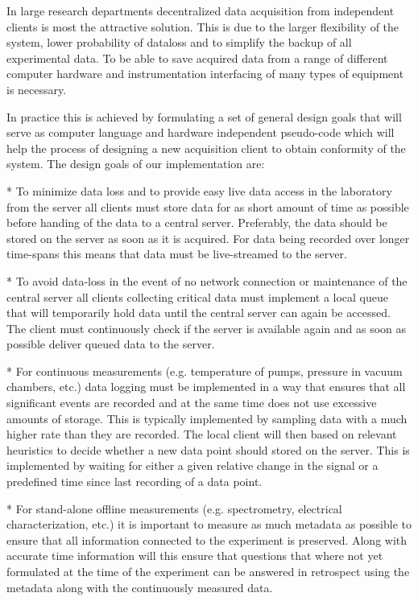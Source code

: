 In large research departments decentralized data acquisition from independent
clients is most the attractive solution. This is due to the larger flexibility
of the system, lower probability of dataloss and to simplify the backup of all
experimental data. To be able to save acquired data from a range of different
computer hardware and instrumentation interfacing of many types of equipment is
necessary.

In practice this is achieved by formulating a set of general design goals that
will serve as computer language and hardware independent pseudo-code which will
help the process of designing a new acquisition client to obtain conformity of
the system. The design goals of our implementation are:

* To minimize data loss and to provide easy live data access in the laboratory
  from the server all clients must store data for as short amount of time as
  possible before handing of the data to a central server. Preferably, the data
  should be stored on the server as soon as it is acquired. For data being
  recorded over longer time-spans this means that data must be live-streamed to
  the server.

* To avoid data-loss in the event of no network connection or maintenance
  of the central server all clients collecting critical data must implement a
  local queue that will temporarily hold data until the central server can
  again be accessed. The client must continuously check if the server is
  available again and as soon as possible deliver queued data to the server.

* For continuous measurements (e.g. temperature of pumps, pressure in vacuum
  chambers, etc.) data logging must be implemented in a way that ensures that
  all significant events are recorded and at the same time does not use
  excessive amounts of storage. This is typically implemented by sampling data
  with a much higher rate than they are recorded. The local client will then
  based on relevant heuristics to decide whether a new data point should stored on
  the server. This is implemented by waiting for either a given relative change
  in the signal or a predefined time since last recording of a data point.
  
* For stand-alone offline measurements (e.g. spectrometry, electrical
  characterization, etc.) it is important to measure as much metadata as
  possible to ensure that all information connected to the experiment is
  preserved. Along with accurate time information will this ensure that
  questions that where not yet formulated at the time of the experiment can be
  answered in retrospect using the metadata along with the continuously
  measured data.
  
